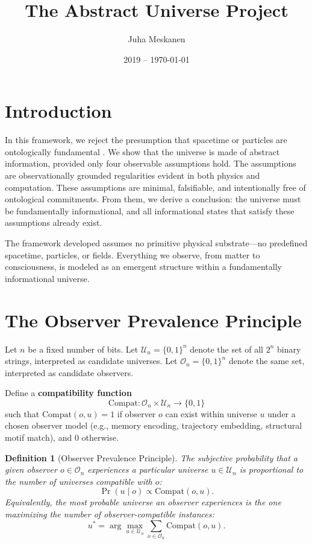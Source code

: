 \documentclass[11pt]{article}
\title{\LARGE The Abstract Universe Project}
\author{Juha Meskanen}
\date{2019 -- \today}
\newtheorem{definition}{Definition}
\begin{document}
\maketitle

\section{Introduction}

In this framework, we reject the presumption that spacetime or particles are ontologically fundamental \cite{wheeler1990} . We show that the universe is made of abstract information, provided only four observable assumptions hold. The assumptions are observationally grounded regularities evident in both physics and computation. These assumptions are minimal, falsifiable, and intentionally free of ontological commitments. From them, we derive a conclusion: the universe must be fundamentally informational, and all informational states that satisfy these assumptions already exist.

The framework developed assumes no primitive physical substrate—no predefined spacetime, particles, or fields. Everything we observe, from matter to consciousness, is modeled as an emergent structure within a fundamentally informational universe.


\section*{The Observer Prevalence Principle}

Let $n$ be a fixed number of bits. Let $\mathcal{U}_n = \{0,1\}^n$ denote the set of all $2^n$ binary strings, interpreted as candidate universes. Let $\mathcal{O}_n = \{0,1\}^n$ denote the same set, interpreted as candidate observers.

Define a \textbf{compatibility function}
\[
      \mathrm{Compat}: \mathcal{O}_n \times \mathcal{U}_n \rightarrow \{0,1\}
\]
such that $\mathrm{Compat}(o, u) = 1$ if observer $o$ can exist within universe $u$ under a chosen observer model (e.g., memory encoding, trajectory embedding, structural motif match), and 0 otherwise.

\begin{definition}[Observer Prevalence Principle]
      The \emph{subjective probability} that a given observer $o \in \mathcal{O}_n$ experiences a particular universe $u \in \mathcal{U}_n$ is proportional to the number of universes compatible with $o$:
      \[
            \Pr(u \mid o) \propto \mathrm{Compat}(o, u).
      \]
      Equivalently, the most probable universe an observer experiences is the one maximizing the number of observer-compatible instances:
      \[
            u^* = \arg\max_{u \in \mathcal{U}_n} \sum_{o \in \mathcal{O}_n} \mathrm{Compat}(o, u).
      \]
\end{definition}
\end{document}
